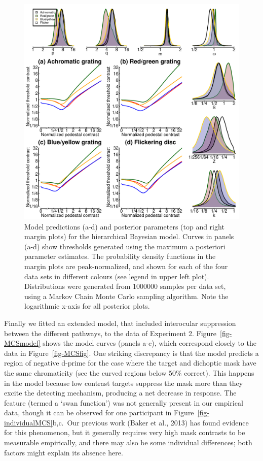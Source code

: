 \documentclass[
  letterpaper,
  DIV=11,
  numbers=noendperiod]{scrartcl}
\begin{document}
\begin{figure}

{\centering \includegraphics{Figures/stanoutput.pdf}

}

\caption{\label{fig-bayesianmodel}Model predictions (a-d) and posterior
parameters (top and right margin plots) for the hierarchical Bayesian
model. Curves in panels (a-d) show thresholds generated using the
maximum a posteriori parameter estimates. The probability density
functions in the margin plots are peak-normalized, and shown for each of
the four data sets in different colours (see legend in upper left plot).
Distributions were generated from 1000000 samples per data set, using a
Markov Chain Monte Carlo sampling algorithm. Note the logarithmic x-axis
for all posterior plots.}

\end{figure}

Finally we fitted an extended model, that included interocular
suppression between the different pathways, to the data of Experiment 2.
Figure~\ref{fig-MCSmodel} shows the model curves (panels a-c), which
correspond closely to the data in Figure~\ref{fig-MCSfig}. One striking
discrepancy is that the model predicts a region of negative d-prime for
the case where the target and dichoptic mask have the same chromaticity
(see the curved regions below 50\% correct). This happens in the model
because low contrast targets suppress the mask more than they excite the
detecting mechanism, producing a net decrease in response. The feature
(termed a `swan function') was not generally present in our empirical
data, though it can be observed for one participant in
Figure~\ref{fig-individualMCS}b,c.~Our previous work (Baker et al.,
2013) has found evidence for this phenomenon, but it generally requires
very high mask contrasts to be measurable empirically, and there may
also be some individual differences; both factors might explain its
absence here.
\end{document}
